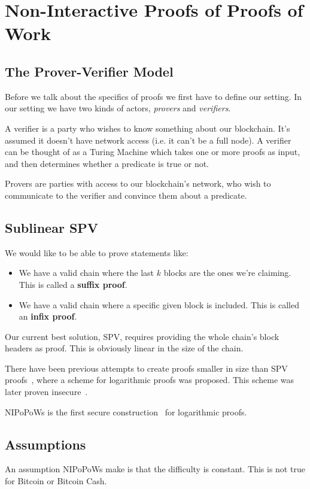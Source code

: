 \section{Non-Interactive Proofs of Proofs of Work}

\subsection{The Prover-Verifier Model}
Before we talk about the specifics of proofs we first have to define our setting. In our setting we have two kinds of actors, \emph{provers} and \emph{verifiers}.

A verifier is a party who wishes to know something about our blockchain. It's assumed it doesn't have network access (i.e. it can't be a full node). A verifier can be thought of as a Turing Machine which takes one or more proofs as input, and then determines whether a predicate is true or not.

Provers are parties with access to our blockchain's network, who wish to communicate to the verifier and convince them about a predicate.

\subsection{Sublinear SPV}
We would like to be able to prove statements like:

\begin{itemize}
  \item We have a valid chain where the last $k$ blocks are the ones we're claiming. This is called a \textbf{suffix proof}.
  \item We have a valid chain where a specific given block is included. This is called an \textbf{infix proof}.
\end{itemize}

Our current best solution, SPV, requires providing the whole chain's block headers as proof. This is obviously linear in the size of the chain.

There have been previous attempts to create proofs smaller in size than SPV proofs~\cite{KLS}, where a scheme for logarithmic proofs was proposed.  This scheme was later proven insecure~\cite{nipopows}.

NIPoPoWs is the first secure construction~\cite{nipopows} for logarithmic proofs.

\subsection{Assumptions}
An assumption NIPoPoWs make is that the difficulty is constant. This is not true for Bitcoin or Bitcoin Cash.

